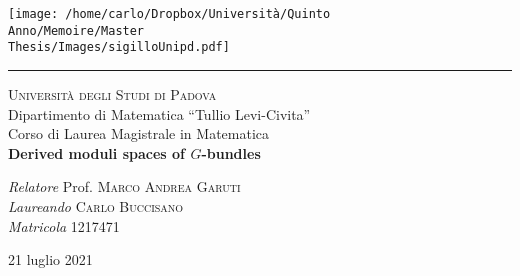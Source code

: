 \begin{titlepage}
    \setlength{\parindent}{0pt}
    \setlength{\parskip}{0pt}
    \begin{center}
        \texttt{[image: /home/carlo/Dropbox/Università/Quinto\\ Anno/Memoire/Master\\ Thesis/Images/sigilloUnipd.pdf]}\\

        \rule{\linewidth}{1pt}

        \vspace{1.5cm}
        \LARGE\textsc{Università degli Studi di Padova}\\
        \vspace{0.4cm}
        \Large{Dipartimento di Matematica ``Tullio Levi-Civita''}\\
        \vspace{0.4cm}
        \Large{Corso di Laurea Magistrale in Matematica}\\
        \vspace{4cm}
        {\fontsize{24pt}{1pt}\bfseries{Derived moduli spaces of $G$-bundles}}\\
        \vspace{6cm}



        \begin{flushleft}
            \large
            \textit{Relatore}  Prof. \textsc{Marco Andrea Garuti}\\
            \vspace{0.1cm}
            \textit{Laureando}  \textsc{Carlo Buccisano}\\
            \vspace{0.1cm}
            \textit{Matricola}  \textsc{1217471}
        \end{flushleft}

        \vfill
        \Large{21 luglio 2021}
    \end{center}

\end{titlepage}
\restoregeometry
\newpage
\thispagestyle{empty}
